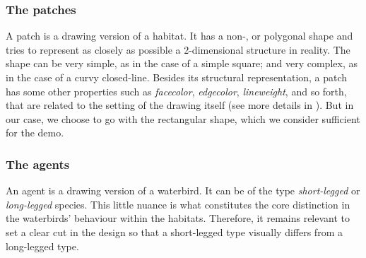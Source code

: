 \subsubsection{The patches}
A patch is a drawing version of a habitat. It has a non-, or polygonal shape and tries to represent as closely as possible a 2-dimensional structure in reality. The shape can be very simple, as in the case of a simple square; and very complex, as in the case of a curvy closed-line. Besides its structural representation, a patch has some other properties such as \emph{facecolor}, \emph{edgecolor}, \emph{lineweight}, and so forth, that are related to the setting of the drawing itself (see more details in \cite{matplotlib.patches}). But in our case, we choose to go with the rectangular shape, which we consider sufficient for the demo.




\subsubsection{The agents}
An agent is a drawing version of a waterbird. It can be of the type \emph{short-legged} or \emph{long-legged} species. This little nuance is what constitutes the core distinction in the waterbirds' behaviour within the habitats. Therefore, it remains relevant to set a clear cut in the design so that a short-legged type visually differs from a long-legged type.

